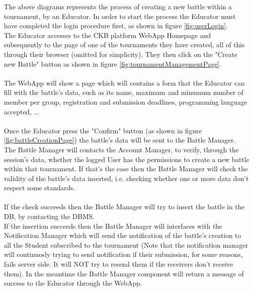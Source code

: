 \documentclass{article}
\begin{document}
{        The above diagrams represents the process of creating a new battle within a tournament,
        by an Educator. In order to start the process the Educator must have completed the login 
        procedure first, as shown in figure \ref{fig:userLogin}. \\
        The Educator accesses to the CKB platform WebApp Homepage and subsequently
        to the page of one of the tournaments they have created, all of this through their browser
        (omitted for simplicity).
        They then click on the "Create new Battle" button as shown in figure \ref{fig:tournamentManagementPage}.
        \\ \\
        The WebApp will show a page which will contains a form that the Educator can fill with
        the battle's data, such as its name, maximum and minumum number of member per group,
        registration and submission deadlines, programming language accepted, ... 
        \\ \\
        Once the Educator press the "Confirm" button (as shown in figure \ref{fig:battleCreationPage})
        the battle's data will be sent to the Battle Manager. \\
        The Battle Manager will contacts the Account Manager, to verify, through the session's 
        data, whether the logged User has the permissions to create a new battle within that 
        tournament. 
        If that's the case then the Battle Manager will check the validity of the battle's data 
        inserted, i.e. checking whether one or more data don't respect some standards.
        \\ \\
        If the check succeeds then the Battle Manager will try to insert the battle in the DB,
        by contacting the DBMS. \\
        If the insertion succeeds then the Battle Manager will interfaces with the Notification
        Manager which will send the notification of the battle's creation to all the Student
        subscribed to the tournament (Note that the notification manager will continuosly trying 
        to send notification if their submission, for some reasons, fails server side. It will 
        NOT try to resend them if the receivers don't receive them). 
        In the meantime the Battle Manager component will return a message of success to 
        the Educator through the WebApp.
        \\ \\
}
\end{document}
